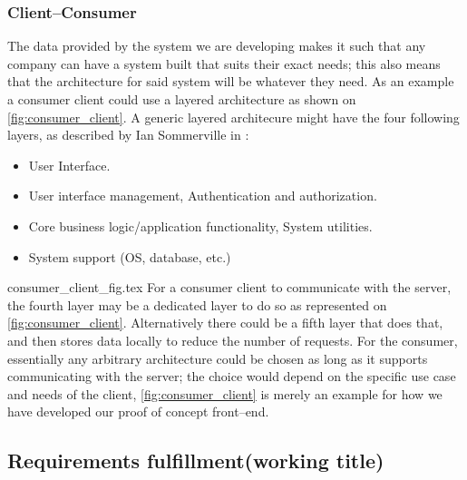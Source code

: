 \subsubsection{Client--Consumer}
The data provided by the system we are developing makes it such that any company can have a system built that suits their exact needs; this also means that the architecture for said system will be whatever they need.
As an example a consumer client could use a layered architecture as shown on \cref{fig:consumer_client}.
A generic layered architecure might have the four following layers, as described by Ian Sommerville in \cite{software_engineering}:
\begin{itemize}
    \item User Interface.
    \item User interface management, Authentication and authorization.
    \item Core business logic/application functionality, System utilities.
    \item System support (OS, database, etc.)
\end{itemize}
{consumer_client_fig.tex}
For a consumer client to communicate with the server, the fourth layer may be a dedicated layer to do so as represented on \cref{fig:consumer_client}.
Alternatively there could be a fifth layer that does that, and then stores data locally to reduce the number of requests.
For the consumer, essentially any arbitrary architecture could be chosen as long as it supports communicating with the server; the choice would depend on the specific use case and needs of the client, \cref{fig:consumer_client} is merely an example for how we have developed our proof of concept front--end.

\subsection{Requirements fulfillment(working title)}

